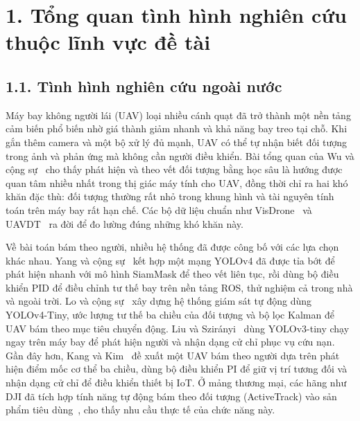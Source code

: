 \renewcommand{\thetable}{\arabic{table}}\renewcommand{\thefigure}{\arabic{figure}}\setcounter{table}{0}\setcounter{figure}{0}

\section*{1. Tổng quan tình hình nghiên cứu thuộc lĩnh vực đề tài}

\subsection*{1.1. Tình hình nghiên cứu ngoài nước}

Máy bay không người lái (UAV) loại nhiều cánh quạt đã trở thành một nền tảng cảm biến phổ biến nhờ giá thành giảm nhanh và khả năng bay treo tại chỗ. Khi gắn thêm camera và một bộ xử lý đủ mạnh, UAV có thể tự nhận biết đối tượng trong ảnh và phản ứng mà không cần người điều khiển. Bài tổng quan của Wu và cộng sự~\cite{wu2022uavsurvey} cho thấy phát hiện và theo vết đối tượng bằng học sâu là hướng được quan tâm nhiều nhất trong thị giác máy tính cho UAV, đồng thời chỉ ra hai khó khăn đặc thù: đối tượng thường rất nhỏ trong khung hình và tài nguyên tính toán trên máy bay rất hạn chế. Các bộ dữ liệu chuẩn như VisDrone~\cite{zhu2022visdrone} và UAVDT~\cite{du2018uavdt} ra đời để đo lường đúng những khó khăn này.

Về bài toán bám theo người, nhiều hệ thống đã được công bố với các lựa chọn khác nhau. Yang và cộng sự~\cite{yang2023uavtrack} kết hợp một mạng YOLOv4 đã được tỉa bớt để phát hiện nhanh với mô hình SiamMask để theo vết liên tục, rồi dùng bộ điều khiển PID để điều chỉnh tư thế bay trên nền tảng ROS, thử nghiệm cả trong nhà và ngoài trời. Lo và cộng sự~\cite{lo2021tracking} xây dựng hệ thống giám sát tự động dùng YOLOv4-Tiny, ước lượng tư thế ba chiều của đối tượng và bộ lọc Kalman để UAV bám theo mục tiêu chuyển động. Liu và Szirányi~\cite{liu2021rescue} dùng YOLOv3-tiny chạy ngay trên máy bay để phát hiện người và nhận dạng cử chỉ phục vụ cứu nạn. Gần đây hơn, Kang và Kim~\cite{kang2025following} đề xuất một UAV bám theo người dựa trên phát hiện điểm mốc cơ thể ba chiều, dùng bộ điều khiển PI để giữ vị trí tương đối và nhận dạng cử chỉ để điều khiển thiết bị IoT. Ở mảng thương mại, các hãng như DJI đã tích hợp tính năng tự động bám theo đối tượng (ActiveTrack) vào sản phẩm tiêu dùng~\cite{dji_activetrack}, cho thấy nhu cầu thực tế của chức năng này.

